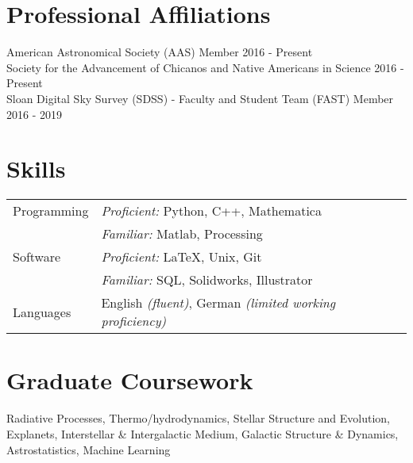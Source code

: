 \documentclass[margin,line]{resume}
\begin{document}
\begin{resume}
\newpage

\section{\mysidestyle \textcolor{bcolor}{Professional Affiliations}}
American Astronomical Society (AAS) Member \hfill 2016 - Present \\
Society for the Advancement of Chicanos and Native Americans in Science \hfill 2016 - Present \\
Sloan Digital Sky Survey (SDSS) - Faculty and Student Team (FAST) Member \hfill 2016 - 2019 


\section{\mysidestyle \textcolor{bcolor}{Skills}} 

\noindent\begin{tabular}{@{}l|l}
  \multirow{1}{*}{{\sc Programming}} & \textit{Proficient:} Python, C++, Mathematica \\
    & \textit{Familiar:} Matlab, Processing \vspace{.1cm} \\
  \multirow{1}{*}{{\sc Software}} & \textit{Proficient:} \LaTeX, Unix, Git \\
    & \textit{Familiar:} SQL, Solidworks, Illustrator  \vspace{.1cm} \\
  \multirow{1}{*}{{\sc Languages}} & English \textit{(fluent)}, German \textit{(limited working proficiency)}
\end{tabular}


\section{\mysidestyle \textcolor{bcolor}{Graduate Coursework}} 

Radiative Processes, Thermo/hydrodynamics, Stellar Structure and Evolution, Explanets, Interstellar \& Intergalactic Medium, Galactic Structure \& Dynamics, Astrostatistics, Machine Learning


\end{resume}
\end{document}
